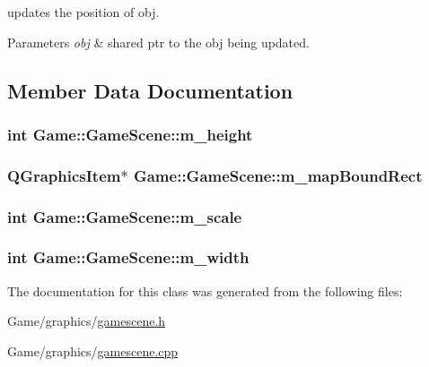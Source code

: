 updates the position of obj. 


\begin{DoxyParams}{Parameters}
{\em obj} & shared ptr to the obj being updated. \\
\hline
\end{DoxyParams}


\subsection{Member Data Documentation}
\hypertarget{classGame_1_1GameScene_a86406ae913fa1410adee082dcfa27486}{
\subsubsection[{m\-\_\-height}]{\setlength{\rightskip}{0pt plus 5cm}int Game\-::\-Game\-Scene\-::m\-\_\-height\hspace{0.3cm}{\ttfamily [private]}}}\label{classGame_1_1GameScene_a86406ae913fa1410adee082dcfa27486}
\hypertarget{classGame_1_1GameScene_ac6fd0bea8129c9b61b8418324f371e16}{
\subsubsection[{m\-\_\-map\-Bound\-Rect}]{\setlength{\rightskip}{0pt plus 5cm}Q\-Graphics\-Item$\ast$ Game\-::\-Game\-Scene\-::m\-\_\-map\-Bound\-Rect\hspace{0.3cm}{\ttfamily [private]}}}\label{classGame_1_1GameScene_ac6fd0bea8129c9b61b8418324f371e16}
\hypertarget{classGame_1_1GameScene_ab88ed80cd4feb3838bca9221a15b478f}{
\subsubsection[{m\-\_\-scale}]{\setlength{\rightskip}{0pt plus 5cm}int Game\-::\-Game\-Scene\-::m\-\_\-scale\hspace{0.3cm}{\ttfamily [private]}}}\label{classGame_1_1GameScene_ab88ed80cd4feb3838bca9221a15b478f}
\hypertarget{classGame_1_1GameScene_aff9acff4c58359bddb14bffec789d78b}{
\subsubsection[{m\-\_\-width}]{\setlength{\rightskip}{0pt plus 5cm}int Game\-::\-Game\-Scene\-::m\-\_\-width\hspace{0.3cm}{\ttfamily [private]}}}\label{classGame_1_1GameScene_aff9acff4c58359bddb14bffec789d78b}


The documentation for this class was generated from the following files\-:\begin{DoxyCompactItemize}
\item 
Game/graphics/\hyperlink{gamescene_8h}{gamescene.\-h}\item 
Game/graphics/\hyperlink{gamescene_8cpp}{gamescene.\-cpp}\end{DoxyCompactItemize}
